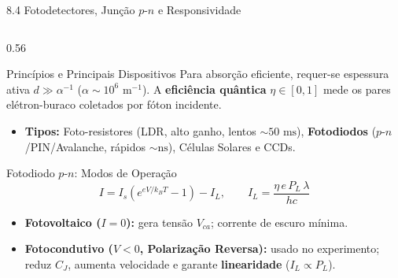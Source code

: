 \documentclass[aspectratio=169, 9pt]{beamer}
\begin{document}
\begin{frame}[shrink=3]{8.4 Fotodetectores, Junção $p\text{-}n$ e Responsividade}
  \begin{columns}[T, onlytextwidth]
    \begin{column}{0.56\textwidth}
      \begin{block}{Princípios e Principais Dispositivos}
        Para absorção eficiente, requer-se espessura ativa $d \gg \alpha^{-1}$ ($\alpha \sim 10^6\text{ m}^{-1}$). A \textbf{eficiência quântica} $\eta \in [0,1]$ mede os pares elétron-buraco coletados por fóton incidente.
        \begin{itemize}
          \item \textbf{Tipos:} Foto-resistores (LDR, alto ganho, lentos $\sim 50\text{ ms}$), \textbf{Fotodiodos} ($p\text{-}n$/PIN/Avalanche, rápidos $\sim\text{ns}$), Células Solares e CCDs.
        \end{itemize}
      \end{block}
      \vspace{-0.1cm}
      \begin{exampleblock}{Fotodiodo $p\text{-}n$: Modos de Operação}
        \[
          I = I_s\left(e^{eV/k_B T} - 1\right) - I_L, \qquad I_L = \frac{\eta \, e \, P_L \, \lambda}{hc}
        \]
        \begin{itemize}
          \item \textbf{Fotovoltaico ($I=0$):} gera tensão $V_{ca}$; corrente de escuro mínima.
          \item \textbf{Fotocondutivo ($V < 0$, Polarização Reversa):} usado no experimento; reduz $C_J$, aumenta velocidade e garante \textbf{linearidade} ($I_L \propto P_L$).
        \end{itemize}
      \end{exampleblock}
    \end{column}


\end{columns}
\end{frame}
\end{document}
